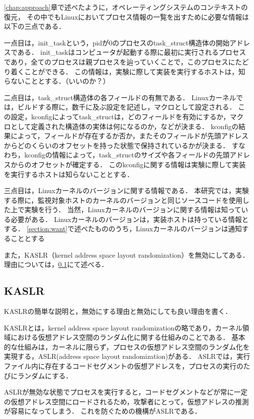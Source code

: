 \ref{chap:approach}章で述べたように，オペレーティングシステムのコンテキストの復元，
その中でもLinuxにおいてプロセス情報の一覧を出すために必要な情報は以下の三点である．

一点目は，init_taskという，pidが0のプロセスのtask\_struct構造体の開始アドレスである．
init_taskはコンピュータが起動する際に最初に実行されるプロセスであり，全てのプロセスは親プロセスを辿っていくことで，このプロセスにたどり着くことができる．
この情報は，実験に際して実装を実行するホストは，知らないこととする．（いいのか？）

二点目は，task\_struct構造体の各フィールドの有無である．
Linuxカーネルでは，ビルドする際に，数千に及ぶ設定を記述し，マクロとして設定される．
この設定，kconfigによってtask\_structは，どのフィールドを有効にするか，マクロとして定義された構造体の実体は何になるのか，などが決まる．
kconfigの結果によって，フィールドが存在するか否か，またそのフィールドが先頭アドレスからどのくらいのオフセットを持った状態で保持されているかが決まる．
すなわち，kconfigの情報によって，task\_structのサイズや各フィールドの先頭アドレスからのオフセットが確定する．
このkconfigに関する情報は実験に際して実装を実行するホストは知らないこととする．

三点目は，Linuxカーネルのバージョンに関する情報である．
本研究では，実験する際に，監視対象ホストのカーネルのバージョンと同じソースコードを使用した上で実験を行う．
当然，Linuxカーネルのバージョンに関する情報は知っている必要がある．
Linuxカーネルのバージョンは，実装ホストは持っている情報とする．
\ref{section:want}で述べたもののうち，Linuxカーネルのバージョンは通知することとする

また，KASLR（kernel address space layout randomization）を無効にしてある．理由については，\ref{subsection:kaslr}にて述べる．

\subsection{KASLR}
\label{subsection:kaslr}

KASLRの簡単な説明と，無効にする理由と無効にしても良い理由を書く．

KASLRとは，kernel address space layout randomizationの略であり，カーネル領域における仮想アドレス空間のランダム化に関する仕組みのことである．
基本的な仕組みは，カーネルに限らず，プロセスの仮想アドレス空間のランダム化を実現する，ASLR(address space layout randomization)がある．
ASLRでは，実行ファイル内に存在するコードセグメントの仮想アドレスを，プロセスの実行のたびにランダムにする．

ASLRが無効な状態でプロセスを実行すると，コードセグメントなどが常に一定の仮想アドレス空間にロードされるため，攻撃者にとって，仮想アドレスの推測が容易になってしまう．
これを防ぐための機構がASLRである．

